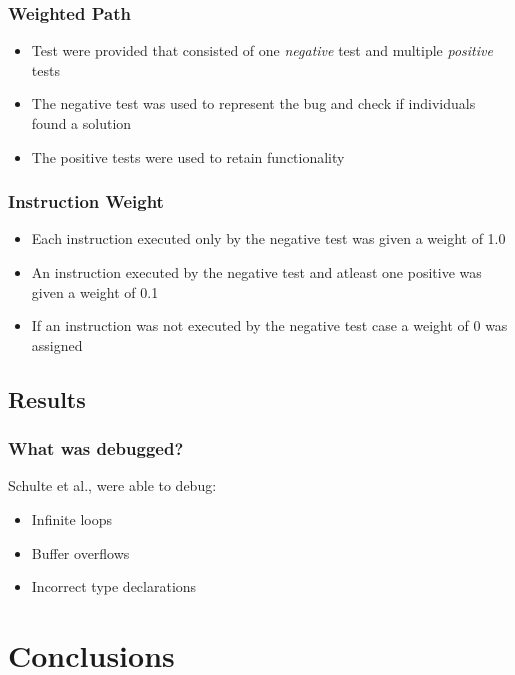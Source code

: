 \documentclass{beamer}
\begin{document}
\begin{frame}
\frametitle{Weighted Path}
\begin{itemize}

\item Test were provided that consisted of one \textit{negative} test and multiple \textit{positive} tests
   	\item The negative test was used to represent the bug and check if individuals found a solution
	\item The positive tests were used to retain functionality
	
\end{itemize}
\end{frame}


\begin{frame}
  \frametitle{Instruction Weight}
  
    \begin{itemize}
  	\item Each instruction executed only by the negative test was given a  weight of 1.0
  	\item An instruction executed by the negative test and atleast one positive was given a weight of 0.1
  	\item If an instruction was not executed by the negative test case a weight of 0 was assigned 
  \end{itemize}
\end{frame}

\subsection[Results]{Results}

\begin{frame}
\frametitle{What was debugged?}
Schulte et al., were able to debug:
\begin{itemize}
\item Infinite loops
\item Buffer overflows
\item Incorrect type declarations

\end{itemize}


\end{frame}




\section[Conclusions]{Conclusions}
\end{document}
